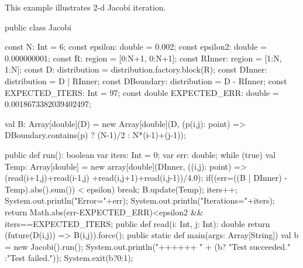 
This example illustrates 2-d Jacobi iteration.

\begin{xten}
public class Jacobi {
   const N: Int = 6;
   const epsilon: double = 0.002;
   const epsilon2: double = 0.000000001;
   const R: region = [0:N+1, 0:N+1];
   const RInner: region = [1:N, 1:N];
   const D: distribution = distribution.factory.block(R);
   const DInner: distribution = D | RInner;
   const DBoundary: distribution = D - RInner;
   const EXPECTED_ITERS: Int  = 97;
   const double EXPECTED_ERR: double = 0.0018673382039402497;
     
   val B: Array[double](D) = new Array[double](D,
        (p(i,j): point) => DBoundary.contains(p) ? (N-1)/2 : N*(i-1)+(j-1));
    
   public def run(): boolean {
      var iters: Int = 0;
      var err: double;
      while (true) {
        val Temp: Array[double] = 
           new array[double](DInner, ((i,j): point) =>
             (read(i+1,j)+read(i-1,j) +read(i,j+1)+read(i,j-1))/4.0);
        if((err=((B | DInner) - Temp).abs().sum()) < epsilon)
           break; 
        B.update(Temp);
        iters++; 
      }
      System.out.println("Error="+err);
      System.out.println("Iterations="+iters);
      return Math.abs(err-EXPECTED_ERR)<epsilon2 
          && iters==EXPECTED_ITERS;
   }
   public def read(i: Int, j: Int): double {
      return (future(D(i,j)) => B(i,j)).force();
   }
   public static def main(args: Array[String]) {
      val b = new Jacobi().run();
      System.out.println("++++++ "
                         + (b? "Test succeeded."
                             :"Test failed."));
      System.exit(b?0:1);
   }
}
\end{xten}
